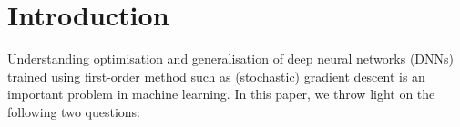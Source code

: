 \documentclass{article}
\begin{document}
\section{Introduction}
Understanding optimisation and generalisation of deep neural networks (DNNs) trained using first-order method such as (stochastic) gradient descent is an important problem in machine learning. In this paper, we throw light on the following two questions:%
\begin{comment}
Recent works based on the \emph{trajectory} analysis \cite{} have shown that, sufficiently over-parameterised DNNs can be optimised to achieve zero training error by a randomly initialised SGD procedure. The gist of the \emph{trajectory} based analysis is the following: consider the dataset given by $(x_s,y_s)_{i=1}^n\in \R^{d_{in}\times} \R$, and for an input $x_s\in \R^{d_{in}},i\in[n]$\footnote{We denote the set $\{1,\ldots, n\}$ by $[n]$.}, let $\hat{y}_{\Theta_t}(x_s)$ be predicted output of the DNN whose parameters/tunable weights at time $t$ is $\Theta_t\in \R^{d_{net}}$. Say one is interested in minimising the squared loss given by $L_{\Theta_t}=\frac{1}{2}\sum_{i=1}^n\left(\hat{y}_{\Theta_t}(x_s)-y_s\right)^2$ by a SGD procedure, then the idea behind the trajectory analysis is to look at the dynamics of the error term defined as $e_t(i)\stackrel{def}{=}\hat{y}_{\Theta_t}(x_s) -y_s$. Denoting $e_t=(e_t(i),i\in[n])\in \R^n$, one can study the following error recursion:
\begin{align}\label{eq:trajecbasic}
e_{t+1}=e_t-\alpha_t K_t e_t,
\end{align}
where $\alpha_t>0$ is a small stepsize, $K_t\in \R^{n\times n}$ is a Gram matrix. This gram matrix is in turn expressed as $K_t=\Psi_t^\top \Psi_t$, wherein, $\Psi_t$ is a $d_{net}\times n$ matrix known as the \emph{neural tangent feature} (NTF) matrix, which is the collection of the gradient of the network output with respect to the network parameters, and whose $s^{th}$ column is given by $\Psi_t(s)=(\frac{\partial \hat{y}_{\Theta_t}(x_s)}{\partial \theta},\theta \in \Theta)$.
\end{comment}
\end{document}
